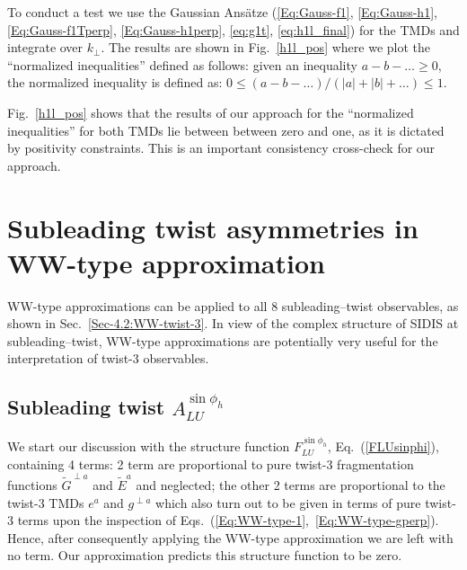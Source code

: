 \documentclass[a4paper,11pt]{article}
\begin{document}
{To conduct a test we use the Gaussian Ans\"atze 
(\ref{Eq:Gauss-f1}, \ref{Eq:Gauss-h1}, \ref{Eq:Gauss-f1Tperp}, 
\ref{Eq:Gauss-h1perp}, \ref{eq:g1t}, \ref{eq:h1l_final}) for the
TMDs and integrate over $k_\perp$. The results are shown in 
Fig.~\ref{h1l_pos} where we plot the ``normalized inequalities'' 
defined as follows:
given an inequality $a-b-\dots \ge 0$, the normalized inequality 
is defined as: $0 \le (a-b-\dots)/(|a|+|b|+\dots) \le 1$.

Fig.~\ref{h1l_pos} shows that the results of our approach for the 
``normalized inequalities'' for both TMDs lie between between
zero and one, as it is dictated by positivity constraints.
This is an important consistency cross-check for our approach.

}

\newpage
\section{Subleading twist asymmetries in WW-type approximation}
\label{Sec-7:twist-3-and-WW}

WW-type approximations can be applied to all 8 subleading--twist observables,
as shown in Sec.~\ref{Sec-4.2:WW-twist-3}. In view of the complex 
structure of SIDIS at subleading--twist, WW-type approximations
are potentially very useful for the interpretation of twist-3 observables. 

\subsection{\boldmath Subleading twist  $A_{LU}^{\sin\phi_h}$}
\label{Sec-7.1:FLU}

We start our discussion with the structure function $F_{LU}^{\sin\phi_h}$,
Eq.~(\ref{FLUsinphi}), containing 4 terms: 
2 term are proportional to pure twist-3 fragmentation functions 
$\tilde{G}^{\perp a}$ and $\tilde{E}^a$ and neglected; the other 2
terms are proportional to the twist-3 TMDs $e^a$ and $g^{\perp a}$ which
also turn out to be given in terms of pure twist-3 terms upon the 
inspection of Eqs.~(\ref{Eq:WW-type-1},~\ref{Eq:WW-type-gperp}).
Hence, after consequently applying the WW-type approximation we are left 
with no term. Our approximation predicts this structure function to be zero.
\end{document}
